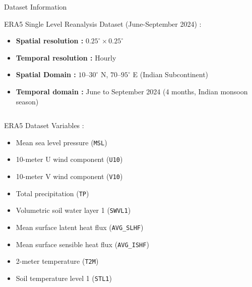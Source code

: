 \documentclass[8pt, aspectratio=169]{beamer}
\newcommand{\pdflink}[2]{\href{file:papers/#1.pdf}{#2}}
\begin{document}
\begin{frame}{Dataset Information}
    \begin{block}{ERA5 Single Level Reanalysis Dataset (June-September 2024) \tiny \cite{hersbach2020era5} :}
        \footnotesize
        \begin{itemize}
            \item \textbf{Spatial resolution :} \texttt{$0.25^\circ \times 0.25^\circ$}
            \item \textbf{Temporal resolution :} Hourly
            \item \textbf{Spatial Domain :} $10$--$30^\circ$ N, $70$--$95^\circ$ E (Indian Subcontinent)
            \item \textbf{Temporal domain :} June to September 2024 (4 months, Indian monsoon season)
        \end{itemize}
    \end{block}

    \begin{columns}[T, totalwidth=0.9\textwidth] 
        \footnotesize
        \begin{block}{ERA5 Dataset Variables :}
            \begin{itemize}
                \item Mean sea level pressure (\texttt{MSL})
                \item 10-meter U wind component (\texttt{U10})
                \item 10-meter V wind component (\texttt{V10})
                \item Total precipitation (\texttt{TP})
                \item Volumetric soil water layer 1 (\texttt{SWVL1})
                \item Mean surface latent heat flux (\texttt{AVG\_SLHF})
                \item Mean surface sensible heat flux (\texttt{AVG\_ISHF})
                \item 2-meter temperature (\texttt{T2M})
                \item Soil temperature level 1 (\texttt{STL1})
            \end{itemize}
        \end{block}


\end{columns}
\end{frame}
\end{document}
